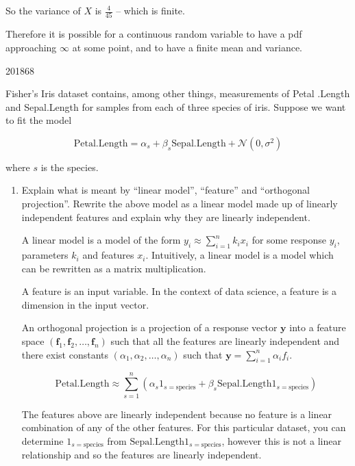 \documentclass[10pt,\jkfside,a4paper]{article}
\begin{document}
\begin{enumerate}[label=\arabic*]
So the variance of $X$ is $\frac{4}{45}$ -- which is finite.

Therefore it is possible for a continuous random variable to have a pdf
approaching $\infty$ at some point, and to have a finite mean and variance.

\end{enumerate}

\begin{examquestion}{2018}{6}{8}

Fisher's Iris dataset contains, among other things, measurements of Petal
.Length and Sepal.Length for samples from each of three species of iris.
Suppose we want to fit the model

\[
\text{Petal.Length} = \alpha_s + \beta_s \text{Sepal.Length} + \mathcal{N}
(0, \sigma^2)
\]

where $s$ is the species.

\begin{enumerate}[label=(\alph*)]

\item Explain what is meant by ``linear model'', ``feature'' and
``orthogonal projection''. Rewrite the above model as a linear model made up
of linearly independent features and explain why they are linearly
independent.

A linear model is a model of the form $y_i \approx \sum^{n}_{i=1} k_i x_i $
for some response $y_i$, parameters $k_i$ and features $x_i$. Intuitively, a
linear model is a model which can be rewritten as a matrix multiplication.

A feature is an input variable. In the context of data science, a feature is
a dimension in the input vector.

An orthogonal projection is a projection of a response vector $\mathbf{y}$
into a feature space $(\mathbf{f}_1, \mathbf{f}_2, \dots, \mathbf{f}_n)$
such that all the features are linearly independent and there exist
constants $(\alpha_1, \alpha_2, \dots, \alpha_n)$ such that $\mathbf{y} =
\sum^n_{i=1} \alpha_i f_i$.

\[
\text{Petal.Length} \approx \sum^n_{s=1} \left(\alpha_s 1_{s=\text{species}} +
\beta_s
\text{Sepal.Length} 1_{s=\text{species}}\right)
\]

The features above are linearly independent because no feature is a linear
combination of any of the other features. For this particular dataset, you
can determine $1_{s=\text{species}}$ from $\text{Sepal.Length}
1_{s=\text{species}}$, however this is not a linear relationship and so the
features are linearly independent.


\end{enumerate}
\end{examquestion}
\end{document}

